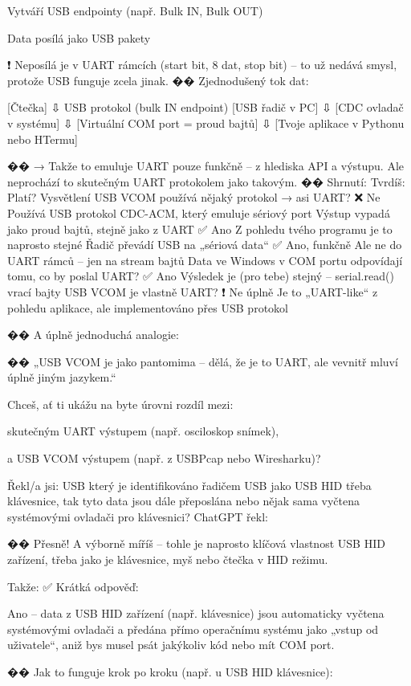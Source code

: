     Vytváří USB endpointy (např. Bulk IN, Bulk OUT)

    Data posílá jako USB pakety

❗ Neposílá je v UART rámcích (start bit, 8 dat, stop bit) – to už nedává smysl, protože USB funguje zcela jinak.
�� Zjednodušený tok dat:

[Čtečka] 
   ⇩ USB protokol (bulk IN endpoint)
[USB řadič v PC]
   ⇩ 
[CDC ovladač v systému]
   ⇩ 
[Virtuální COM port = proud bajtů]
   ⇩ 
[Tvoje aplikace v Pythonu nebo HTermu]

�� → Takže to emuluje UART pouze funkčně – z hlediska API a výstupu.
Ale neprochází to skutečným UART protokolem jako takovým.
�� Shrnutí:
Tvrdíš:	Platí?	Vysvětlení
USB VCOM používá nějaký protokol → asi UART?	❌ Ne	Používá USB protokol CDC-ACM, který emuluje sériový port
Výstup vypadá jako proud bajtů, stejně jako z UART	✅ Ano	Z pohledu tvého programu je to naprosto stejné
Řadič převádí USB na „sériová data“	✅ Ano, funkčně	Ale ne do UART rámců – jen na stream bajtů
Data ve Windows v COM portu odpovídají tomu, co by poslal UART?	✅ Ano	Výsledek je (pro tebe) stejný – serial.read() vrací bajty
USB VCOM je vlastně UART?	❗ Ne úplně	Je to „UART-like“ z pohledu aplikace, ale implementováno přes USB protokol

�� A úplně jednoduchá analogie:

    �� „USB VCOM je jako pantomima – dělá, že je to UART, ale vevnitř mluví úplně jiným jazykem.“

Chceš, ať ti ukážu na byte úrovni rozdíl mezi:

    skutečným UART výstupem (např. osciloskop snímek),

    a USB VCOM výstupem (např. z USBPcap nebo Wiresharku)?

Řekl/a jsi:
USB který je identifikováno řadičem USB jako USB HID třeba klávesnice, tak tyto data jsou dále přeposlána nebo nějak sama vyčtena systémovými ovladači pro klávesnici?
ChatGPT řekl:

�� Přesně! A výborně míříš – tohle je naprosto klíčová vlastnost USB HID zařízení, třeba jako je klávesnice, myš nebo čtečka v HID režimu.

Takže:
✅ Krátká odpověď:

    Ano – data z USB HID zařízení (např. klávesnice) jsou automaticky vyčtena systémovými ovladači a předána přímo operačnímu systému jako „vstup od uživatele“, aniž bys musel psát jakýkoliv kód nebo mít COM port.

�� Jak to funguje krok po kroku (např. u USB HID klávesnice):

